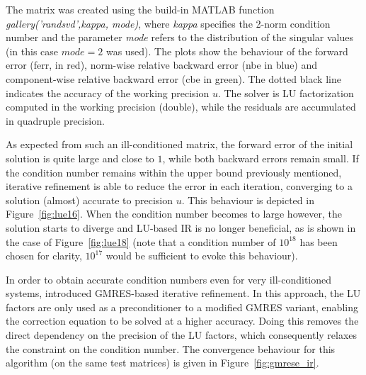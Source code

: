 The matrix was created using the build-in MATLAB function \textit{gallery('randsvd',kappa, mode)}, where \textit{kappa} specifies the 2-norm condition number and the parameter \textit{mode} refers to the distribution of the singular values (in this case $mode=2$ was used). The plots show the behaviour of the forward error (ferr, in red), norm-wise relative backward error (nbe in blue) and component-wise relative backward error (cbe in green). The dotted black line indicates the accuracy of the working precision $u$. The solver is LU factorization computed in the working precision (double), while the residuals are accumulated in quadruple precision.

As expected from such an ill-conditioned matrix, the forward error of the initial solution is quite large and close to $1$, while both backward errors remain small. If the condition number remains within the upper bound previously mentioned, iterative refinement is able to reduce the error in each iteration, converging to a solution (almost) accurate to precision $u$. This behaviour is depicted in Figure~\hyperref[fig:lue16]{\ref{fig:lue16}}. When the condition number becomes to large however, the solution starts to diverge and LU-based IR is no longer beneficial, as is shown in the case of Figure~\hyperref[fig:lue18]{\ref{fig:lue18}} (note that a condition number of $10^{18}$ has been chosen for clarity, $10^{17}$ would be sufficient to evoke this behaviour).

In order to obtain accurate condition numbers even for very ill-conditioned systems, \cite{carson_new_2017} introduced GMRES-based iterative refinement. In this approach, the LU factors are only used as a preconditioner to a modified GMRES variant, enabling the correction equation to be solved at a higher accuracy. Doing this removes the direct dependency on the precision of the LU factors, which consequently relaxes the constraint on the condition number. The convergence behaviour for this algorithm (on the same test matrices) is given in Figure~\hyperref[fig:gmrese_ir]{\ref{fig:gmrese_ir}}.

